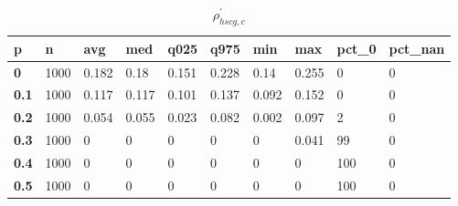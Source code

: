 \begin{table}[h]
 \centering 
\footnotesize
\caption{$\rho_{hscg,c}^\prime $}
\label{tab:alphahscgc}
\begin{tabular}[h]{|l|l|l|l|l|l|l|l|l|l|
    } \hline
\textbf{ p} & \textbf{ n} & \textbf{ avg} & \textbf{ med} & \textbf{ q025} & \textbf{ q975} & \textbf{ min} & \textbf{ max} & \textbf{ pct\_0} & \textbf{ pct\_nan}
    \\ \hline
  \textbf{  0} & 1000 & 0.182 &  0.18 & 0.151 & 0.228 &  0.14 & 0.255 &   0 & 0
    \\ \hline
  \textbf{0.1} & 1000 & 0.117 & 0.117 & 0.101 & 0.137 & 0.092 & 0.152 &   0 & 0
    \\ \hline
  \textbf{0.2} & 1000 & 0.054 & 0.055 & 0.023 & 0.082 & 0.002 & 0.097 &   2 & 0
    \\ \hline
  \textbf{0.3} & 1000 &     0 &     0 &     0 &     0 &     0 & 0.041 &  99 & 0
    \\ \hline
  \textbf{0.4} & 1000 &     0 &     0 &     0 &     0 &     0 &     0 & 100 & 0
    \\ \hline
  \textbf{0.5} & 1000 &     0 &     0 &     0 &     0 &     0 &     0 & 100 & 0
    \\ \hline
 \end{tabular}
 \end{table}

